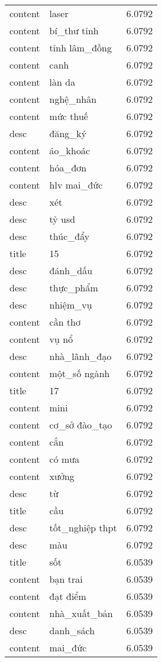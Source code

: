 \documentclass{article}
\begin{document}
\begin{tabular}{lll}
content & laser & 6.0792\\
content & bí\_thư tỉnh & 6.0792\\
content & tỉnh lâm\_đồng & 6.0792\\
content & canh & 6.0792\\
content & làn da & 6.0792\\
content & nghệ\_nhân & 6.0792\\
content & mức thuế & 6.0792\\
desc & đăng\_ký & 6.0792\\
content & áo\_khoác & 6.0792\\
content & hóa\_đơn & 6.0792\\
content & hlv mai\_đức & 6.0792\\
desc & xét & 6.0792\\
desc & tỷ usd & 6.0792\\
desc & thúc\_đẩy & 6.0792\\
title & 15 & 6.0792\\
desc & đánh\_dấu & 6.0792\\
desc & thực\_phẩm & 6.0792\\
desc & nhiệm\_vụ & 6.0792\\
content & cần thơ & 6.0792\\
content & vụ nổ & 6.0792\\
desc & nhà\_lãnh\_đạo & 6.0792\\
content & một\_số ngành & 6.0792\\
title & 17 & 6.0792\\
content & mini & 6.0792\\
content & cơ\_sở đào\_tạo & 6.0792\\
content & cắn & 6.0792\\
content & có mưa & 6.0792\\
content & xưởng & 6.0792\\
desc & từ & 6.0792\\
title & cầu & 6.0792\\
desc & tốt\_nghiệp thpt & 6.0792\\
desc & màu & 6.0792\\
title & sốt & 6.0539\\
content & bạn trai & 6.0539\\
content & đạt điểm & 6.0539\\
content & nhà\_xuất\_bản & 6.0539\\
desc & danh\_sách & 6.0539\\
content & mai\_đức & 6.0539\\

\end{tabular}
\end{document}
